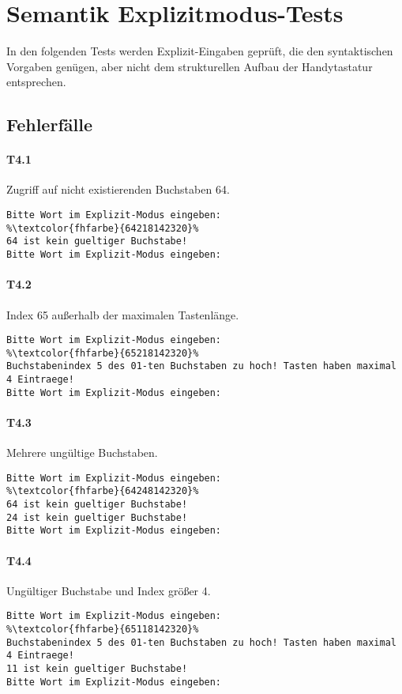 \section{Semantik Explizitmodus-Tests}\label{sec:semantik-explizitmodus-tests}
In den folgenden Tests werden Explizit-Eingaben geprüft, die den syntaktischen Vorgaben genügen, aber nicht dem strukturellen Aufbau der Handytastatur entsprechen.

\subsection*{Fehlerfälle}\label{subsec:sematik-fehler}

\paragraph*{T4.1} Zugriff auf nicht existierenden Buchstaben 64.
\begin{lstlisting}[escapechar=\%]
Bitte Wort im Explizit-Modus eingeben:
%\textcolor{fhfarbe}{64218142320}%
64 ist kein gueltiger Buchstabe!
Bitte Wort im Explizit-Modus eingeben:
\end{lstlisting}

\paragraph*{T4.2} Index 65 außerhalb der maximalen Tastenlänge.
\begin{lstlisting}[escapechar=\%]
Bitte Wort im Explizit-Modus eingeben:
%\textcolor{fhfarbe}{65218142320}%
Buchstabenindex 5 des 01-ten Buchstaben zu hoch! Tasten haben maximal 4 Eintraege!
Bitte Wort im Explizit-Modus eingeben:
\end{lstlisting}

\paragraph*{T4.3} Mehrere ungültige Buchstaben.
\begin{lstlisting}[escapechar=\%]
Bitte Wort im Explizit-Modus eingeben:
%\textcolor{fhfarbe}{64248142320}%
64 ist kein gueltiger Buchstabe!
24 ist kein gueltiger Buchstabe!
Bitte Wort im Explizit-Modus eingeben:
\end{lstlisting}

\paragraph*{T4.4} Ungültiger Buchstabe und Index größer 4.
\begin{lstlisting}[escapechar=\%]
Bitte Wort im Explizit-Modus eingeben:
%\textcolor{fhfarbe}{65118142320}%
Buchstabenindex 5 des 01-ten Buchstaben zu hoch! Tasten haben maximal 4 Eintraege!
11 ist kein gueltiger Buchstabe!
Bitte Wort im Explizit-Modus eingeben:
\end{lstlisting}

